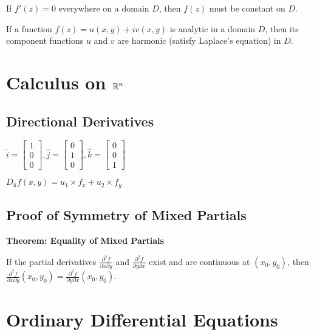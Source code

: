 If $f'(z) = 0$ everywhere on a domain $D$, then $f(z)$ must be constant on $D$.

If a function $f(z) = u(x,y) + iv(x,y)$ is analytic in a domain $D$, then its component functions $u$ and $v$ are harmonic (satisfy Laplace's equation) in $D$.







\section{Calculus on $\mathbb{R}^n$}

\subsection{Directional Derivatives}

$\hat{i} = \begin{bmatrix} 1 \\ 0 \\ 0 \end{bmatrix}, \hat{j} = \begin{bmatrix} 0 \\ 1 \\ 0 \end{bmatrix}, \hat{k} = \begin{bmatrix} 0 \\ 0 \\ 1 \end{bmatrix}$

$D_{\hat{u}} f(x,y) = u_{1} \times f_{x} + u_{2} \times f_{y}$



\subsection{Proof of Symmetry of Mixed Partials}

\textbf{Theorem: Equality of Mixed Partials}

If the partial derivatives $\frac{\partial^{2} f}{\partial x \partial y}$ and $\frac{\partial^{2} f}{\partial y \partial x}$ exist and are continuous at $(x_{0}, y_{0})$, then $\frac{\partial^{2} f}{\partial x \partial y}(x_{0}, y_{0}) = \frac{\partial^{2} f}{\partial y \partial x}(x_{0}, y_{0})$.

\pagebreak





\section{Ordinary Differential Equations}

